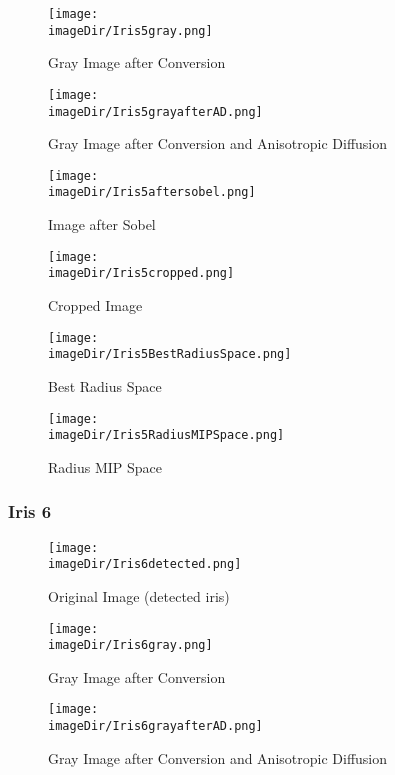 \documentclass[11pt, a4paper, twoside]{article}   	%
\newcommand{\imageDir}{images}
\begin{document}
\begin{figure}[H]
	\centering
	\texttt{[image: \\imageDir/Iris5gray.png]}
	\caption{Gray Image after Conversion}
\end{figure}

\begin{figure}[H]
	\centering
	\texttt{[image: \\imageDir/Iris5grayafterAD.png]}
	\caption{Gray Image after Conversion and Anisotropic Diffusion}
\end{figure}

\begin{figure}[H]
	\centering
	\texttt{[image: \\imageDir/Iris5aftersobel.png]}
	\caption{Image after Sobel}
\end{figure}

\begin{figure}[H]
	\centering
	\texttt{[image: \\imageDir/Iris5cropped.png]}
	\caption{Cropped Image}
\end{figure}

\begin{figure}[H]
	\centering
	\texttt{[image: \\imageDir/Iris5BestRadiusSpace.png]}
	\caption{Best Radius Space}
	\label{fig-best-radius-iris5}
\end{figure}

\begin{figure}[H]
	\centering
	\texttt{[image: \\imageDir/Iris5RadiusMIPSpace.png]}
	\caption{Radius MIP Space}
	\label{fig-mip-space-iris5}
\end{figure}

\newpage
\subsubsection{Iris 6}
\begin{figure}[H]
	\centering
	\texttt{[image: \\imageDir/Iris6detected.png]}
	\caption{Original Image (detected iris)}
\end{figure}

\begin{figure}[H]
	\centering
	\texttt{[image: \\imageDir/Iris6gray.png]}
	\caption{Gray Image after Conversion}
\end{figure}

\begin{figure}[H]
	\centering
	\texttt{[image: \\imageDir/Iris6grayafterAD.png]}
	\caption{Gray Image after Conversion and Anisotropic Diffusion}
\end{figure}
\end{document}
